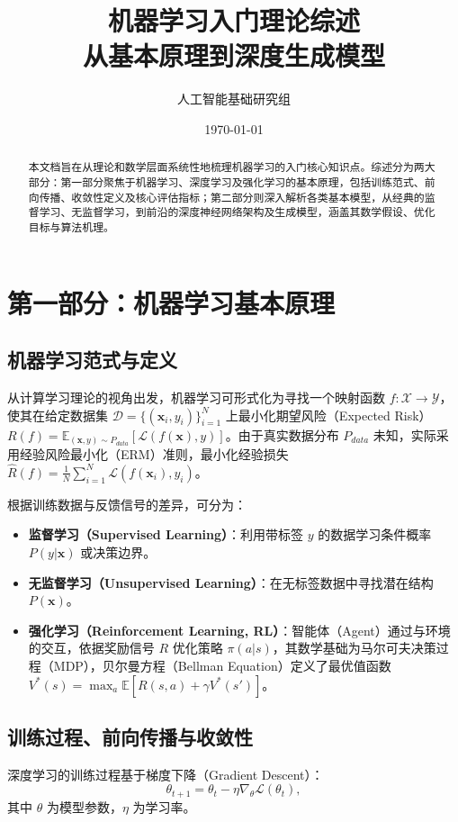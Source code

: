 \documentclass[12pt,a4paper]{ctexart}
\title{\textbf{机器学习入门理论综述}\\ \large{从基本原理到深度生成模型}}
\author{人工智能基础研究组}
\date{\today}
\begin{document}
\maketitle

\begin{abstract}
本文档旨在从理论和数学层面系统性地梳理机器学习的入门核心知识点。综述分为两大部分：第一部分聚焦于机器学习、深度学习及强化学习的基本原理，包括训练范式、前向传播、收敛性定义及核心评估指标；第二部分则深入解析各类基本模型，从经典的监督学习、无监督学习，到前沿的深度神经网络架构及生成模型，涵盖其数学假设、优化目标与算法机理。
\end{abstract}

\section{第一部分：机器学习基本原理}
\label{sec:fundamentals}

\subsection{机器学习范式与定义}
从计算学习理论的视角出发，机器学习可形式化为寻找一个映射函数 $f: \mathcal{X} \rightarrow \mathcal{Y}$，使其在给定数据集 $\mathcal{D} = \{(\mathbf{x}_i, y_i)\}_{i=1}^N$ 上最小化期望风险（Expected Risk）$R(f) = \mathbb{E}_{(\mathbf{x},y)\sim P_{data}} [\mathcal{L}(f(\mathbf{x}), y)]$。由于真实数据分布 $P_{data}$ 未知，实际采用经验风险最小化（ERM）准则，最小化经验损失 $\hat{R}(f) = \frac{1}{N}\sum_{i=1}^N \mathcal{L}(f(\mathbf{x}_i), y_i)$。

根据训练数据与反馈信号的差异，可分为：
\begin{itemize}
    \item \textbf{监督学习（Supervised Learning）}：利用带标签 $y$ 的数据学习条件概率 $P(y|\mathbf{x})$ 或决策边界。
    \item \textbf{无监督学习（Unsupervised Learning）}：在无标签数据中寻找潜在结构 $P(\mathbf{x})$。
    \item \textbf{强化学习（Reinforcement Learning, RL）}：智能体（Agent）通过与环境的交互，依据奖励信号 $R$ 优化策略 $\pi(a|s)$，其数学基础为马尔可夫决策过程（MDP），贝尔曼方程（Bellman Equation）定义了最优值函数 $V^*(s) = \max_a \mathbb{E}[R(s,a) + \gamma V^*(s')]$。
\end{itemize}

\subsection{训练过程、前向传播与收敛性}
深度学习的训练过程基于梯度下降（Gradient Descent）：
\begin{equation}
    \theta_{t+1} = \theta_t - \eta \nabla_{\theta} \mathcal{L}(\theta_t),
\end{equation}
其中 $\theta$ 为模型参数，$\eta$ 为学习率。
\end{document}
